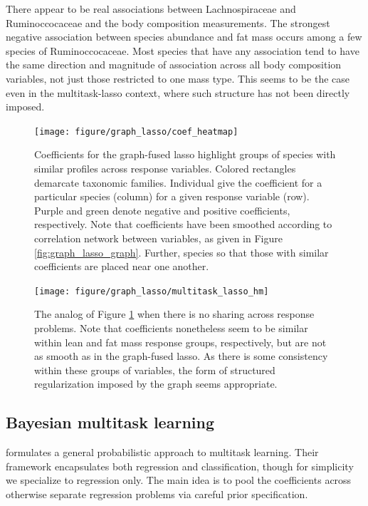 \documentclass[14pt]{extarticle}
\begin{document}
There appear to be real associations between Lachnospiraceae and Ruminoccocaceae
and the body composition measurements. The strongest negative association
between species abundance and fat mass occurs among a few species of
Ruminoccocaceae. Most species that have any association tend to have the same
direction and magnitude of association across all body composition variables,
not just those restricted to one mass type. This seems to be the case even in
the multitask-lasso context, where such structure has not been directly imposed.

\begin{figure}
  \centering
  \texttt{[image: figure/graph\_lasso/coef\_heatmap]}
  \caption{Coefficients for the graph-fused lasso highlight groups of species
    with similar profiles across response
    variables. Colored rectangles demarcate taxonomic families. Individual give
    the coefficient for a particular species (column) for a given response
    variable (row). Purple and green denote negative and positive coefficients,
    respectively. Note that coefficients have been smoothed according to
    correlation network between variables, as given in Figure
    \ref{fig:graph_lasso_graph}. Further, species so that those with similar
    coefficients are placed near one
    another. \label{fig:graph_lasso_coef_heatmap} }
\end{figure}

\begin{figure}
  \centering
  \texttt{[image: figure/graph\_lasso/multitask\_lasso\_hm]}
  \caption{The analog of Figure \ref{fig:graph_lasso_coef_heatmap} when there is
    no sharing across response problems. Note that coefficients nonetheless seem
    to be similar within lean and fat mass response groups, respectively, but
    are not as smooth as in the graph-fused lasso. As there is some consistency
    within these groups of variables, the form of structured regularization
    imposed by the graph seems
    appropriate. \label{fig:graph_lasso_multitask_lasso_hm} }
\end{figure}

\subsection{Bayesian multitask learning}
\label{subsec:bayesian_multitask}

\cite{zhang2005learning} formulates a general probabilistic approach to
multitask learning. Their framework encapsulates both regression and
classification, though for simplicity we specialize to regression only. The main
idea is to pool the coefficients across otherwise separate regression problems
via careful prior specification.
\end{document}
